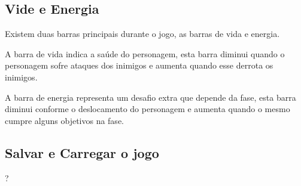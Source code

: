 \subsection {Vide e Energia}

Existem duas barras principais durante o jogo, as barras de vida e energia. 

A barra de vida indica a saúde do personagem, esta barra diminui quando
o personagem sofre ataques dos inimigos e aumenta quando esse derrota os
 inimigos.

A barra de energia representa um desafio extra que depende da fase, esta
 barra diminui conforme o deslocamento do personagem e aumenta quando o 
mesmo cumpre alguns objetivos na fase.

\subsection {Salvar e Carregar o jogo}
?